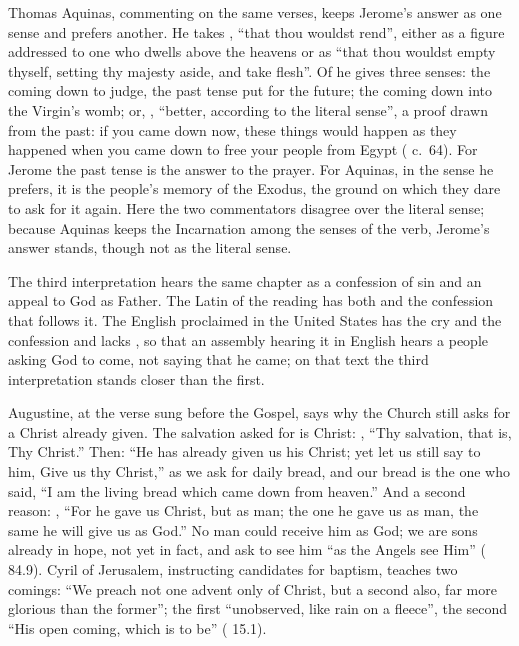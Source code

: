 Thomas Aquinas, commenting on the same verses, keeps Jerome's answer as one
sense and prefers another. He takes , ``that thou wouldst
rend'', either as a figure addressed to one who dwells above the heavens or as
``that thou wouldst empty thyself, setting thy majesty aside, and take
flesh''. Of  he gives three senses: the coming
down to judge, the past tense put for the future; the coming down into the
Virgin's womb; or, , ``better,
according to the literal sense'', a proof drawn from the past: if you came
down now, these things would happen as they happened when you came down to
free your people from Egypt ( c.~64). For Jerome
the past tense is the answer to the prayer. For Aquinas, in the sense he
prefers, it is the people's memory of the Exodus, the ground on which they
dare to ask for it again. Here the two commentators disagree over the literal
sense; because Aquinas keeps the Incarnation among the senses of the verb,
Jerome's answer stands, though not as the literal sense.

The third interpretation hears the same chapter as a confession of sin and an
appeal to God as Father. The Latin of the reading has both
 and the confession that follows it. The English proclaimed
in the United States has the cry and the confession and lacks
, so
that an assembly hearing it in English hears a people asking God to come, not
saying that he came; on that text the third interpretation stands closer than
the first.

Augustine, at the verse sung before the Gospel, says why the Church still
asks for a Christ already given. The salvation asked for is Christ: , ``Thy salvation, that is,
Thy Christ.'' Then: ``He has already given us his Christ; yet let us still say
to him, Give us thy Christ,'' as we ask for daily bread, and our bread is the
one who said, ``I am the living bread which came down from heaven.'' And a
second reason: , ``For he gave us Christ, but as
man; the one he gave us as man, the same he will give us as God.'' No man
could receive him as God; we are sons already in hope, not yet in fact, and
ask to see him ``as the Angels see Him'' ( 84.9).
Cyril of Jerusalem, instructing candidates for baptism, teaches two comings: ``We preach not
one advent only of Christ, but a second also, far more glorious than the
former''; the first ``unobserved, like rain on a fleece'', the second ``His open
coming, which is to be'' ( 15.1).

